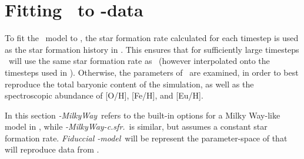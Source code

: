 \section{Fitting \omegamodel\ to \eris-data}
\setlength{}
\newcommand\mwomega{\textit{\omegamodel-MilkyWay}}
\newcommand\mwcomega{\textit{\omegamodel-MilkyWay-c.sfr.}}
\newcommand\fiduccialomega{\textit{Fiduccial \omegamodel-model}}

To fit the \omegamodel\ model to \eris, the star formation rate calculated for each timestep is used as the star formation history in \omegamodel.
This ensures that for sufficiently large timesteps \omegamodel\ will use the same star formation rate as \eris\ (however interpolated onto the timesteps used in \omegamodel).
Otherwise, the parameters of \omegamodel\ are examined, in order to best reproduce the total baryonic content of the simulation, as well as the spectroscopic abundance of [O/H], [Fe/H], and [Eu/H].

In this section \mwomega\ refers to the built-in options for a Milky Way-like model in \omegamodel, while \mwcomega\ is similar, but assumes a constant star formation rate. \fiduccialomega\ will be represent the parameter-space of \omegamodel that will reproduce data from \eris.

